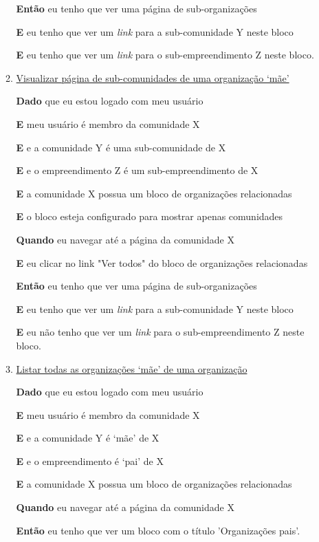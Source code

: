 \begin{enumerate}
\begin{enumerate}
\textbf{Então} eu tenho que ver uma página de sub-organizações

\textbf{E} eu tenho que ver um \textit{link} para a sub-comunidade Y neste
bloco

\textbf{E} eu tenho que ver um \textit{link} para o sub-empreendimento Z
neste bloco.

\item \underline{Visualizar página de sub-comunidades de uma organização `mãe'}

\textbf{Dado} que eu estou logado com meu usuário

\textbf{E} meu usuário é membro da comunidade X

\textbf{E} e a comunidade Y é uma sub-comunidade de X

\textbf{E} e o empreendimento Z é um sub-empreendimento de X

\textbf{E} a comunidade X possua um bloco de organizações relacionadas

\textbf{E} o bloco esteja configurado para mostrar apenas comunidades

\textbf{Quando} eu navegar até a página da comunidade X

\textbf{E} eu clicar no link "Ver todos" do bloco de organizações relacionadas

\textbf{Então} eu tenho que ver uma página de sub-organizações

\textbf{E} eu tenho que ver um \textit{link} para a sub-comunidade Y neste
bloco

\textbf{E} eu não tenho que ver um \textit{link} para o sub-empreendimento Z
neste bloco.

\item \underline{Listar todas as organizações `mãe' de uma organização}

\textbf{Dado} que eu estou logado com meu usuário

\textbf{E} meu usuário é membro da comunidade X

\textbf{E} e a comunidade Y é `mãe' de X

\textbf{E} e o empreendimento é `pai' de X

\textbf{E} a comunidade X possua um bloco de organizações relacionadas

\textbf{Quando} eu navegar até a página da comunidade X

\textbf{Então} eu tenho que ver um bloco com o título 'Organizações pais'.


\end{enumerate}
\end{enumerate}
